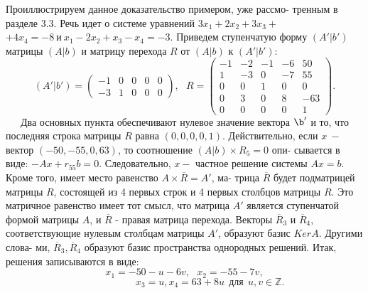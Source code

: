 \documentclass{mai_book}
\begin{document}
	Проиллюстрируем данное доказательство примером, уже рассмо-\linebreak
	тренным в разделе 3.3. Речь идет о системе уравнений $3x_1 + 2x_2 + 3x_3 +$\linebreak
	$+ 4x_4 = -8\ \text{и} \ x_1 - 2x_2 + x_3 - x_4 = -3$. Приведем ступенчатую форму\linebreak
	$(A' | b')$ матрицы $(A | b)$ и матрицу перехода $R$ от $(A | b)$ к $(A' | b')$:
	$$(A' | b') = \begin{pmatrix} -1 & 0 & 0 & 0 & 0 \\ -3 & 1 & 0 & 0 & 0 \end{pmatrix},\ \ \  R = \begin{pmatrix} -1 & -2 & -1 & -6 & 50 \\ 1 & -3 & 0 & -7 & 55 \\ 0 & 0 & 1 & 0 & 0 \\ 0 & 3 & 0 & 8 & -63 \\ 0 & 0 & 0 & 0 & 1 \end{pmatrix}.$$
	\ \ \ Два основных пункта обеспечивают нулевое значение вектора $\b'$ и\linebreak
	то, что последняя строка матрицы $R$ равна $(0, 0, 0, 0, 1)$. Действительно,\linebreak
	если $x \ -$ вектор $(-50, -55, 0, 63)$, то соотношение $(A | b)\times R_5 = 0$ опи-\linebreak
	сывается в виде: $-Ax + r_{55}b = 0$. Следовательно, $x - $ частное решение\linebreak
	системы $Ax = b$. Кроме того, имеет место равенство $A\times\overline{R} = A'$, ма-\linebreak
	трица $\overline{R}$ будет подматрицей матрицы $R$, состоящей из 4 первых строк\linebreak
	и 4 первых столбцов матрицы $R$. Это матричное равенство имеет тот\linebreak
	смысл, что матрица $A'$ является ступенчатой формой матрицы $A$, и\linebreak
	$\overline{R}$ - правая матрица перехода. Векторы $\overline{R}_3$ и $\overline{R}_4$, соответствующие\linebreak
	нулевым столбцам матрицы $A'$, образуют базис $KerA$. Другими слова-\linebreak
	ми, $\overline{R}_3, \overline{R}_4$ образуют базис пространства однородных решений. Итак,\linebreak
	решения записываются в виде:
	$$x_1 = -50 - u - 6v, \ \ \ x_2 = -55 - 7v,$$
	$$ \ \ \ \ \ \ \ \ \ \ \ \ \ \ \ \ \ \ \ \ \ \ \ x_3 = u, x_4 = 63 + 8u \ \ \text{для} \ \ u, v \in \mathbb Z.$$
	
\end{document}
